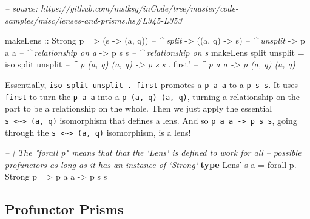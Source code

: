 \documentclass[]{article}
\newenvironment{Shaded}{}{}
\newcommand{\CommentTok}[1]{\textcolor[rgb]{0.38,0.63,0.69}{\textit{#1}}}
\newcommand{\DataTypeTok}[1]{\textcolor[rgb]{0.56,0.13,0.00}{#1}}
\newcommand{\FunctionTok}[1]{\textcolor[rgb]{0.02,0.16,0.49}{#1}}
\newcommand{\KeywordTok}[1]{\textcolor[rgb]{0.00,0.44,0.13}{\textbf{#1}}}
\newcommand{\NormalTok}[1]{#1}
\newcommand{\OtherTok}[1]{\textcolor[rgb]{0.00,0.44,0.13}{#1}}
\begin{document}
\begin{Shaded}
\begin{Highlighting}[]
\CommentTok{-- source: https://github.com/mstksg/inCode/tree/master/code-samples/misc/lenses-and-prisms.hs#L345-L353}

\NormalTok{makeLens}
\OtherTok{    ::} \DataTypeTok{Strong}\NormalTok{ p}
    \OtherTok{=>}\NormalTok{ (s }\OtherTok{->}\NormalTok{ (a, q))        }\CommentTok{-- ^ split}
    \OtherTok{->}\NormalTok{ ((a, q) }\OtherTok{->}\NormalTok{ s)        }\CommentTok{-- ^ unsplit}
    \OtherTok{->}\NormalTok{ p a a                }\CommentTok{-- ^ relationship on a}
    \OtherTok{->}\NormalTok{ p s s                }\CommentTok{-- ^ relationship on s}
\NormalTok{makeLens split unsplit }\FunctionTok{=}
\NormalTok{    iso split unsplit  }\CommentTok{-- ^ p (a, q) (a, q) -> p s s}
  \FunctionTok{.}\NormalTok{ first'             }\CommentTok{-- ^ p a a -> p (a, q) (a, q)}
\end{Highlighting}
\end{Shaded}

Essentially, \texttt{iso\ split\ unsplit\ .\ first\textquotesingle{}} promotes a
\texttt{p\ a\ a} to a \texttt{p\ s\ s}. It uses \texttt{first\textquotesingle{}}
to turn the \texttt{p\ a\ a} into a \texttt{p\ (a,\ q)\ (a,\ q)}, turning a
relationship on the part to be a relationship on the whole. Then we just apply
the essential \texttt{s\ \textless{}\textasciitilde{}\textgreater{}\ (a,\ q)}
isomorphism that defines a lens. And so
\texttt{p\ a\ a\ -\textgreater{}\ p\ s\ s}, going through the
\texttt{s\ \textless{}\textasciitilde{}\textgreater{}\ (a,\ q)} isomorphism, is
a lens!

\begin{Shaded}
\begin{Highlighting}[]
\CommentTok{-- | The "forall p" means that that the `Lens` is defined to work for all}
\CommentTok{-- possible profunctors as long as it has an instance of `Strong`}
\KeywordTok{type} \DataTypeTok{Lens'}\NormalTok{ s a }\FunctionTok{=}\NormalTok{ forall p}\FunctionTok{.} \DataTypeTok{Strong}\NormalTok{ p}
              \OtherTok{=>}\NormalTok{ p a a}
              \OtherTok{->}\NormalTok{ p s s}
\end{Highlighting}
\end{Shaded}

\hypertarget{profunctor-prisms}{%
\subsection{Profunctor Prisms}\label{profunctor-prisms}}
\end{document}
